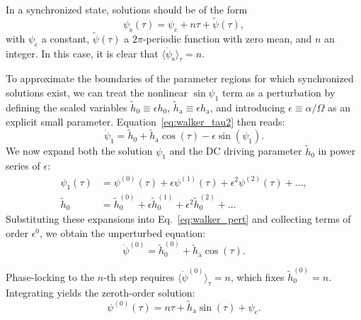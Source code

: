 \documentclass[prb,aps,twocolumn,superscriptaddress,floatfix]{revtex4-2}
\begin{document}
In a synchronized state, solutions should be of the form
\begin{equation}
    \psi_\text{s}(\tau) = \psi_\text{c} + n\tau  + \tilde \psi(\tau),
    \label{eq:theta_sync}
\end{equation}
with $\psi_\text{c}$ a constant, $\tilde\psi(\tau)$ a $2\pi$-periodic function with zero mean, and $n$ an integer. In this case, it is clear that $\langle \dot\psi_\text{s} \rangle_\tau=n$.

To approximate the boundaries of the parameter regions for which synchronized solutions exist, we can treat the nonlinear $\sin\psi_1$ term as a perturbation by defining the scaled variables $\tilde h_0 \equiv \epsilon h_0$, $\tilde h_\text{a} \equiv \epsilon h_\text{a}$, and introducing $\epsilon \equiv \alpha /\Omega$ as an explicit small parameter. Equation~\eqref{eq:walker_tau2} then reads:
\begin{equation}
    \dot{\psi}_1 = \tilde h_0 + \tilde h_\text{a}\cos(\tau) - \epsilon \sin(\psi_1).
    \label{eq:walker_pert}
\end{equation}
We now expand both the solution $\psi_1$ and the DC driving parameter $\tilde h_0$ in power series of $\epsilon$:
\begin{align}
    \psi_1(\tau) &= \psi^{(0)}(\tau) + \epsilon \psi^{(1)}(\tau) + \epsilon^2 \psi^{(2)}(\tau) + \dots, \\
    \tilde h_0 &= \tilde h_0^{(0)} + \epsilon \tilde h_0^{(1)} + \epsilon^2 \tilde h_0^{(2)} + \dots
    \label{eq:expansion2}
\end{align}
Substituting these expansions into Eq.~\eqref{eq:walker_pert} and collecting terms of order $\epsilon^0$, we obtain the unperturbed equation:
\begin{equation}
    \dot{\psi}^{(0)} = \tilde h_0^{(0)} + \tilde h_\text{a} \cos(\tau).
\end{equation}

Phase-locking to the $n$-th step requires $\langle \dot{\psi}^{(0)} \rangle_\tau = n$, which fixes $\tilde h_0^{(0)} = n$. Integrating yields the zeroth-order solution:
\begin{equation}
    \psi^{(0)}(\tau) = n\tau + \tilde h_\text{a} \sin(\tau) + \psi_\text{c}.
    \label{eq:walker_zeroth}
\end{equation}
\end{document}
